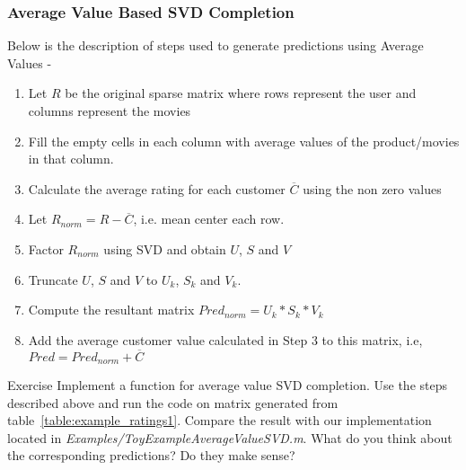   \subsubsection{Average Value Based SVD Completion} 
  Below is the description of steps used to generate predictions using Average Values -
  \begin{enumerate}
    \item Let $R$ be the original sparse matrix where rows represent the user and columns represent the movies
    \item Fill the empty cells in each column with average values of the product/movies in that column.
    \item Calculate the average rating for each customer $\overline{C}$ using the non zero values
    \item Let $R_{norm} = R - \overline{C}$, i.e. mean center each row. 
    \item Factor $R_{norm}$ using SVD and obtain $U$, $S$ and $V$
    \item Truncate $U$, $S$ and $V$ to $U_k$, $S_k$ and $V_k$.
    \item Compute the resultant matrix $Pred_{norm} = U_k*S_k*V_k$
    \item Add the average customer value calculated in Step 3 to this matrix, i.e, $Pred = Pred_{norm} + \overline{C} $
  \end{enumerate}
\begin{myremark}{Exercise }
Implement a function for average value SVD completion. Use the steps described above and run the code on matrix generated from table~\ref{table:example_ratings1}. Compare the result with our implementation located in \textit{Examples/ToyExampleAverageValueSVD.m}. What do you think about the corresponding predictions? Do they make sense? 
\end{myremark}

